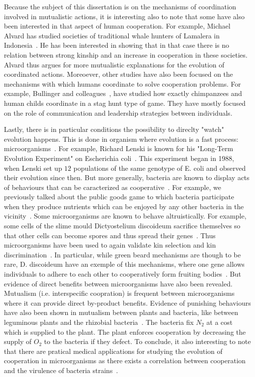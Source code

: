     Because the subject of this dissertation is on the mechanisms of coordination involved in mutualistic actions, it is interesting also to note that some have also been interested in that aspect of human cooperation. For example, Michael Alvard has studied societies of traditional whale hunters of Lamalera in Indonesia~\parencite{Alvard1999, Alvard2003}. He has been interested in showing that in that case there is no relation between strong kinship and an increase in cooperation in these societies. Alvard thus argues for more mutualistic explanations for the evolution of coordinated actions. Moreoever, other studies have also been focused on the mechanisms with which humans coordinate to solve cooperation problems. For example, Bullinger and colleagues~\parencite{Bullinger2011, Duguid2014}, have studied how exactly chimpanzees and human childs coordinate in a stag hunt type of game. They have mostly focused on the role of communication and leadership strategies between individuals.

    Lastly, there is in particular conditions the possibility to direclty "watch" evolution happens. This is done in organism where evolution is a fast process: microorganisms~\parencite{Elena2003}. For example, Richard Lenski is known for his "Long-Term Evolution Experiment" on Escherichia coli~\parencite{Fox2015}. This experiment began in 1988, when Lenski set up $12$ populations of the same genotype of E. coli and observed their evolution since then. But more generally, bacteria are known to display acts of behaviours that can be caracterized as cooperative~\parencite{West2006}. For example, we previously talked about the public goods game to which bacteria participate when they produce nutrients which can be enjoyed by any other bacteria in the vicinity~\parencite{Harrison2013}. Some microorganisms are known to behave altruistically. For example, some cells of the slime mould Dictyostelium discoideum sacrifice themselves so that other cells can become spores and thus spread their genes~\parencite{Strassmann2000}. Thus microorganisms have been used to again validate kin selection and kin discrimination~\parencite{West2006}. In particular, while green beard mechanisms are though to be rare, D. discoideum have an exemple of this mechanisms, where one gene allows individuals to adhere to each other to cooperatively form fruiting bodies~\parencite{Queller2003}. But evidence of direct benefits between microorganisms have also been revealed. Mutualism (i.e. interspecific coopration) is frequent between microorganisms where it can provide direct by-product benefits. Evidence of punishing behaviours have also been shown in mutualism between plants and bacteria, like between leguminous plants and the rhizobial bacteria~\parencite{Kiers2003}. The bacteria fix $N_{2}$ at a cost which is supplied to the plant. The plant enforces cooperation by decreasing the supply of $O_{2}$ to the bacteria if they defect. To conclude, it also interesting to note that there are pratical medical applications for studying the evolution of cooperation in microorganisms as there exists a correlation between cooperation and the virulence of bacteria strains~\parencite{Foster2005}.


